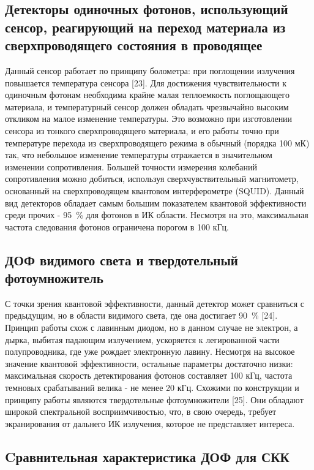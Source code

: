 \subsection{Детекторы одиночных фотонов, использующий сенсор, реагирующий на переход материала из сверхпроводящего состояния в проводящее} \label{subsec:ch1/sec5/sub5}

Данный сенсор работает по принципу болометра: при поглощении излучения повышается температура сенсора [23]. Для достижения чувствительности к одиночным фотонам необходима крайне малая теплоемкость поглощающего материала, и температурный сенсор должен обладать чрезвычайно высоким откликом на малое изменение температуры. Это возможно при изготовлении сенсора из тонкого сверхпроводящего материала, и его работы точно при температуре перехода из сверхпроводящего режима в обычный (порядка 100 мК) так, что небольшое изменение температуры отражается в значительном изменении сопротивления. Большей точности измерения колебаний сопротивления можно добиться, используя сверхчувствительный магнитометр, основанный на сверхпроводящем квантовом интерферометре (SQUID). Данный вид детекторов обладает самым большим показателем квантовой эффективности среди прочих - 95~\% для фотонов в ИК области. Несмотря на это, максимальная частота следования фотонов ограничена порогом в 100 кГц.

\subsection{ДОФ видимого света и твердотельный фотоумножитель} \label{subsec:ch1/sec5/sub6}

С точки зрения квантовой эффективности, данный детектор может сравниться с предыдущим, но в области видимого света, где она достигает 90~\% [24]. Принцип работы схож с лавинным диодом, но в данном случае не электрон, а дырка, выбитая падающим излучением, ускоряется к легированной части полупроводника, где уже рождает электронную лавину. Несмотря на высокое значение квантовой эффективности, остальные параметры достаточно низки: максимальная скорость детектирования фотонов составляет 100 кГц, частота темновых срабатываний велика - не менее 20 кГц. Схожими по конструкции и принципу работы являются твердотельные фотоумножители [25]. Они обладают широкой спектральной восприимчивостью, что, в свою очередь, требует экранирования от дальнего ИК излучения, которое не представляет интереса.

\subsection{Cравнительная характеристика ДОФ для СКК} \label{subsec:ch1/sec5/sub7}

